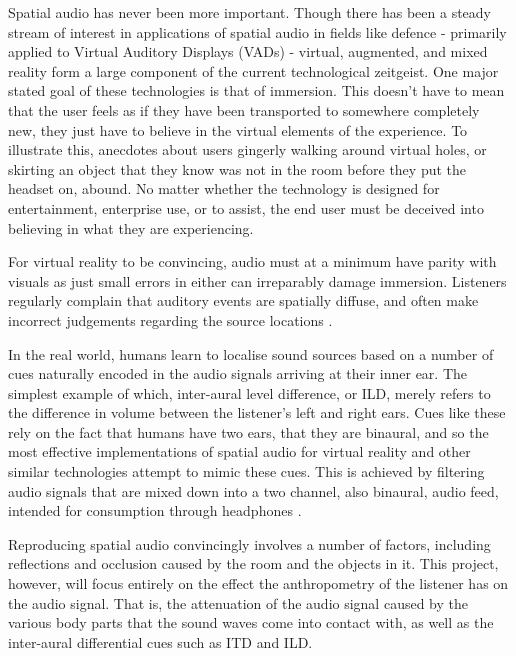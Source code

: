 Spatial audio has never been more important. Though there has been a steady stream of interest in applications of spatial audio in fields like defence - primarily applied to Virtual Auditory Displays (VADs)\citep{bronkhorst} - virtual, augmented, and mixed reality form a large component of the current technological zeitgeist. One major stated goal of these technologies is that of immersion. This doesn't have to mean that the user feels as if they have been transported to somewhere completely new, they just have to believe in the virtual elements of the experience. To illustrate this, anecdotes about users gingerly walking around virtual holes, or skirting an object that they know was not in the room before they put the headset on, abound. No matter whether the technology is designed for entertainment, enterprise use, or to assist, the end user must be deceived into believing in what they are experiencing. 

For virtual reality to be convincing, audio must at a minimum have parity with visuals as just small errors in either can irreparably damage immersion. Listeners regularly complain that auditory events are spatially diffuse, and often make incorrect judgements regarding the source locations \citep{wenzel1}.

In the real world, humans learn to localise sound sources based on a number of cues naturally encoded in the audio signals arriving at their inner ear. The simplest example of which, inter-aural level difference, or ILD, merely refers to the difference in volume between the listener's left and right ears. Cues like these rely on the fact that humans have two ears, that they are binaural, and so the most effective implementations of spatial audio for virtual reality and other similar technologies attempt to mimic these cues. This is achieved by filtering audio signals that are mixed down into a two channel, also binaural, audio feed, intended for consumption through headphones \citep{Algazi2011}.

Reproducing spatial audio convincingly involves a number of factors, including reflections and occlusion caused by the room and the objects in it. This project, however, will focus entirely on the effect the anthropometry of the listener has on the audio signal. That is, the attenuation of the audio signal caused by the various body parts that the sound waves come into contact with, as well as the inter-aural differential cues such as ITD and ILD.

